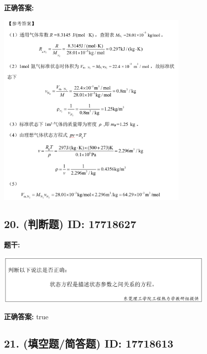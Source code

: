 \documentclass[12pt]{article}
\begin{document}
\textbf{正确答案:}

\begin{center}\includegraphics[width=0.7\textwidth, height=0.2\textheight, keepaspectratio]{question_19_17718616/correct_answer_1_img_1.png}\end{center}

\vspace{0.5em}\hrulefill\vspace{1em}

\subsection*{20. (判断题) \small ID: 17718627}

\textbf{题干:}


\begin{center}\includegraphics[width=0.8\textwidth, height=0.25\textheight, keepaspectratio]{question_20_17718627/title_img_1.png}\end{center}

\textbf{正确答案:}
true

\vspace{0.5em}\hrulefill\vspace{1em}

\subsection*{21. (填空题/简答题) \small ID: 17718613}
\end{document}
